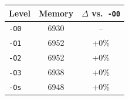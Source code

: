\begin{tabular*}{\columnwidth}{@{\extracolsep\fill}lcc@{\extracolsep\fill}}
\toprule
\textbf{Level} & \textbf{Memory} & \textbf{$\Delta$ vs.\ \texttt{-O0}} \\
\midrule
\texttt{-O0} & 6930 & -- \\
\texttt{-O1} & 6952 & +0\% \\
\texttt{-O2} & 6952 & +0\% \\
\texttt{-O3} & 6938 & +0\% \\
\texttt{-Os} & 6948 & +0\% \\
\bottomrule
\end{tabular*}
